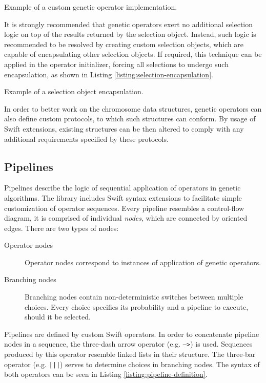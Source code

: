 \begin{listing}[ht]
	\caption{Example of a custom genetic operator implementation.}
	\label{listing:custom-operator}
\end{listing}

It is strongly recommended that genetic operators exert no additional selection logic on top of the results returned by the selection object. Instead, such logic is recommended to be resolved by creating custom selection objects, which are capable of encapsulating other selection objects. If required, this technique can be applied in the operator initializer, forcing all selections to undergo such encapsulation, as shown in Listing \ref{listing:selection-encapsulation}.

\begin{listing}[ht]
	\caption{Example of a selection object encapsulation.}
	\label{listing:selection-encapsulation}
\end{listing}

In order to better work on the chromosome data structures, genetic operators can also define custom protocols, to which such structures can conform. By usage of Swift extensions, existing structures can be then altered to comply with any additional requirements specified by these protocols.

\subsection{Pipelines}\label{section:pipelines}
Pipelines describe the logic of sequential application of operators in genetic algorithms. The library includes Swift syntax extensions to facilitate simple customization of operator sequences. Every pipeline resembles a control-flow diagram, it is comprised of individual \textit{nodes}, which are connected by oriented edges. There are two types of nodes:
~
\begin{description}
	\item[Operator nodes]
	Operator nodes correspond to instances of application of genetic operators.

	\item[Branching nodes]
	Branching nodes contain non-deterministic switches between multiple choices. Every choice specifies its probability and a pipeline to execute, should it be selected.
\end{description}

Pipelines are defined by custom Swift operators. In order to concatenate pipeline nodes in a sequence, the three-dash arrow operator (e.g. \texttt{--->}) is used. Sequences produced by this operator resemble linked lists in their structure. The three-bar operator (e.g. \texttt{|||}) serves to determine choices in branching nodes. The syntax of both operators can be seen in Listing \ref{listing:pipeline-definition}.

